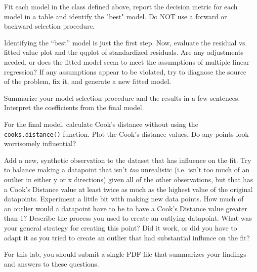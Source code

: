 \documentclass{article}\usepackage[]{graphicx}\usepackage[]{color}
\begin{document}
\begin{exercise}
 Fit each model in the class defined above, report the decision metric for each model in a table and identify the "best" model. Do NOT use a forward or backward selection procedure.
\end{exercise}

\begin{exercise}
 Identifying the ``best'' model is just the first step. Now, evaluate the  residual vs. fitted value plot and the qqplot of standardized residuals. Are any adjustments needed, or does the fitted model seem to meet the assumptions of multiple linear regression? If any assumptions appear to be violated, try to diagnose the source of the problem, fix it, and generate a new fitted model.
\end{exercise}

\begin{exercise}
Summarize your model selection procedure and the results in a few sentences. Interpret the coefficients from the final model. 
\end{exercise}

\begin{exercise}
For the final model, calculate Cook's distance without using the {\tt cooks.distance()} function. Plot the Cook's distance values. Do any points look worrisomely influential?
\end{exercise}

\begin{exercise}
Add a new, synthetic observation to the dataset that has influence on the fit. Try to balance making a datapoint that isn't {\em too} unrealistic (i.e. isn't too much of an outlier in either y or x directions) given all of the other observations, but that has a Cook's Distance value at least twice as much as the highest value of the original datapoints. Experiment a little bit with making new data points. How much of an outlier would a datapoint have to be to have a Cook's Distance value greater than 1? Describe the process you used to create an outlying datapoint. What was your general strategy for creating this point? Did it work, or did you have to adapt it as you tried to create an outlier that had substantial influnce on the fit?
\end{exercise}

For this lab, you should submit a single PDF file that summarizes your findings and answers to these questions.
\end{document}
